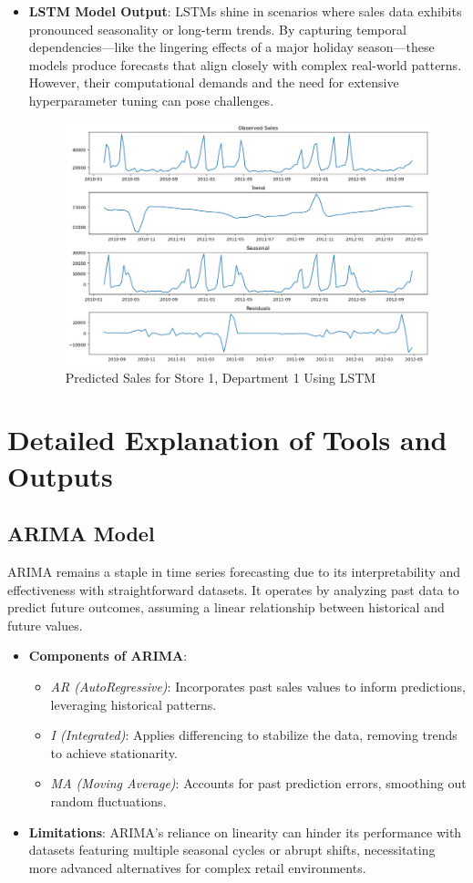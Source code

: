 \begin{itemize}
    \item \textbf{LSTM Model Output}: LSTMs shine in scenarios where sales data exhibits pronounced seasonality or long-term trends. By capturing temporal dependencies—like the lingering effects of a major holiday season—these models produce forecasts that align closely with complex real-world patterns. However, their computational demands and the need for extensive hyperparameter tuning can pose challenges.
    \begin{figure}[h]
        \centering
        \includegraphics[width=0.8\linewidth]{./figures_adarsh/LSTM.png}
        \caption{Predicted Sales for Store 1, Department 1 Using LSTM}
        \label{fig:sales_forecast}
    \end{figure}
\end{itemize}

\section{Detailed Explanation of Tools and Outputs}
\subsection{ARIMA Model}
ARIMA remains a staple in time series forecasting due to its interpretability and effectiveness with straightforward datasets. It operates by analyzing past data to predict future outcomes, assuming a linear relationship between historical and future values.
\begin{itemize}
    \item \textbf{Components of ARIMA}:
    \begin{itemize}
        \item \textit{AR (AutoRegressive)}: Incorporates past sales values to inform predictions, leveraging historical patterns.
        \item \textit{I (Integrated)}: Applies differencing to stabilize the data, removing trends to achieve stationarity.
        \item \textit{MA (Moving Average)}: Accounts for past prediction errors, smoothing out random fluctuations.
    \end{itemize}
    \item \textbf{Limitations}: ARIMA’s reliance on linearity can hinder its performance with datasets featuring multiple seasonal cycles or abrupt shifts, necessitating more advanced alternatives for complex retail environments.
\end{itemize}

